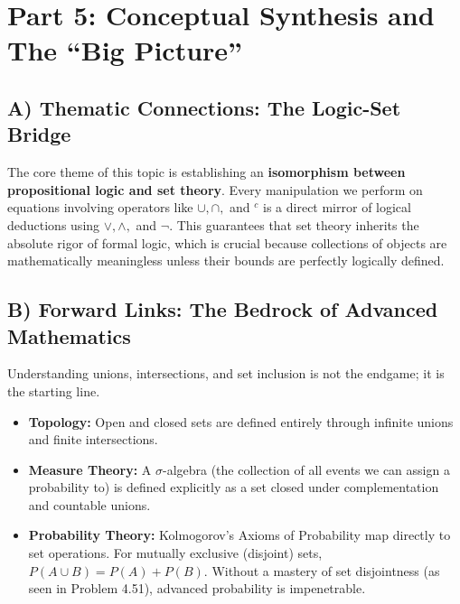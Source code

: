 \documentclass[11pt]{article}
\begin{document}
\section{Part 5: Conceptual Synthesis and The ``Big Picture''}

\subsection{A) Thematic Connections: The Logic-Set Bridge}
The core theme of this topic is establishing an \textbf{isomorphism between propositional logic and set theory}. Every manipulation we perform on equations involving operators like $\cup, \cap,$ and $^c$ is a direct mirror of logical deductions using $\lor, \land,$ and $\neg$. This guarantees that set theory inherits the absolute rigor of formal logic, which is crucial because collections of objects are mathematically meaningless unless their bounds are perfectly logically defined.

\subsection{B) Forward Links: The Bedrock of Advanced Mathematics}
Understanding unions, intersections, and set inclusion is not the endgame; it is the starting line. 
\begin{itemize}
    \item \textbf{Topology:} Open and closed sets are defined entirely through infinite unions and finite intersections.
    \item \textbf{Measure Theory:} A $\sigma$-algebra (the collection of all events we can assign a probability to) is defined explicitly as a set closed under complementation and countable unions. 
    \item \textbf{Probability Theory:} Kolmogorov’s Axioms of Probability map directly to set operations. For mutually exclusive (disjoint) sets, $P(A \cup B) = P(A) + P(B)$. Without a mastery of set disjointness (as seen in Problem 4.51), advanced probability is impenetrable.
\end{itemize}

\end{document}
